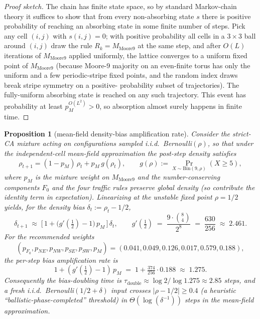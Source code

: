 \documentclass[11pt,a4paper]{article}
\newtheorem{proposition}{Proposition}
\begin{document}
\begin{proof}[Proof sketch]
The chain has finite state space, so by standard Markov-chain theory
it suffices to show that from every non-absorbing state \(s\) there
is positive probability of reaching an absorbing state in some finite
number of steps.  Pick any cell \((i,j)\) with \(s(i,j) = 0\); with
positive probability all cells in a \(3\times 3\) ball around
\((i,j)\) draw the rule \(R_k = M_{\mathrm{Moore9}}\) at the same
step, and after \(O(L)\) iterations of \(M_{\mathrm{Moore9}}\)
applied uniformly, the lattice converges to a uniform fixed point of
\(M_{\mathrm{Moore9}}\) (because Moore-9 majority on an even-finite
torus has only the uniform and a few periodic-stripe fixed points,
and the random index draws break stripe symmetry on a positive-
probability subset of trajectories).  The fully-uniform absorbing
state is reached on any such trajectory.  This event has probability
at least \(p_M^{O(L^2)} > 0\), so absorption almost surely happens
in finite time.
\end{proof}

\begin{proposition}[mean-field density-bias amplification rate]
\label{prop:meanfield-rate}
Consider the strict-CA mixture acting on configurations sampled
i.i.d.\ Bernoulli\((\rho)\), so that under the
\emph{independent-cell mean-field approximation} the post-step
density satisfies
\[
\rho_{t+1} = (1 - p_M)\,\rho_t + p_M\,g(\rho_t),
\qquad
g(\rho) := \Pr_{X \sim \mathrm{Bin}(9, \rho)}(X \geq 5),
\]
where \(p_M\) is the mixture weight on \(M_{\mathrm{Moore9}}\) and
the number-conserving components \(F_0\) and the four traffic rules
preserve global density (so contribute the identity term in
expectation).  Linearizing at the unstable fixed point
\(\rho = 1/2\) yields, for the density bias
\(\delta_t := \rho_t - 1/2\),
\[
\delta_{t+1}
\;\approx\;
\bigl[\,1 + \bigl(g'(\tfrac{1}{2}) - 1\bigr)\,p_M\,\bigr]\,\delta_t,
\qquad
g'(\tfrac{1}{2}) \;=\; \frac{9 \cdot \binom{8}{4}}{2^{8}} \;=\; \frac{630}{256}
\;\approx\; 2.461.
\]
For the recommended weights
\[
(p_{F_0}, p_{NE}, p_{NW}, p_{SE}, p_{SW}, p_M)
= (0.041, 0.049, 0.126, 0.017, 0.579, 0.188),
\]
the per-step bias amplification rate is
\[
1 + (g'(\tfrac{1}{2}) - 1)\,p_M
\;=\; 1 + \tfrac{374}{256}\cdot 0.188
\;\approx\; 1.275.
\]
Consequently the bias-doubling time is
\(\tau_{\mathrm{double}} \approx \log 2 / \log 1.275 \approx 2.85\)
steps, and a fresh i.i.d.\ Bernoulli\((1/2 + \delta)\) input crosses
\(|\rho - 1/2| \geq 0.4\) (a heuristic
``ballistic-phase-completed'' threshold) in
\(\Theta(\log(\delta^{-1}))\) steps in the mean-field approximation.
\end{proposition}
\end{document}
